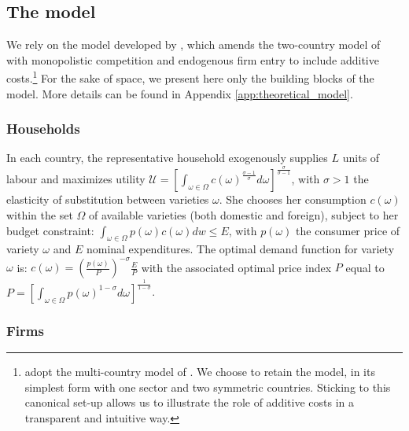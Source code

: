 \documentclass[a4paper,11pt]{article}
\begin{document}
\subsection{The model}


We rely on the model developed by \cite{sorensen2014}, which amends the two-country model of \cite{melitz} with monopolistic competition and endogenous firm entry to include additive costs.\footnote{\cite{Irrazabal_2015} adopt the multi-country model of \cite{chaney2008}.
We choose to retain the \cite{melitz} model, in its simplest form with one sector and two symmetric countries.
Sticking to this canonical set-up allows us to illustrate the role of additive costs in a transparent and intuitive way.}
For the sake of space, we  present here only the building blocks of the model. More details can be found in Appendix \ref{app:theoretical_model}.

\subsubsection{Households}

In each country, the representative household exogenously supplies $L$ units of labour and maximizes utility $\mathcal{U} = \left[ \int_{\omega \in \Omega}c(\omega)^{\frac{\sigma-1}{\sigma}} d\omega \right]^{\frac{\sigma}{\sigma-1}}$, with $\sigma>1$ the elasticity of substitution between varieties $\omega$. She chooses her consumption $c(\omega)$  within the set $\Omega$ of available varieties (both domestic and foreign), subject to her budget constraint: $\int_{\omega \in \Omega} p(\omega) c(\omega) dw \leq E$, with $p(\omega)$ the consumer price of variety $\omega$ and $E$ nominal expenditures. The optimal demand function for variety $\omega$ is: $c(\omega) = \left(\frac{p(\omega)}{P}  \right)^{-\sigma} \frac{E}{P}$ with the associated optimal price index $P$ equal to $P = \left[ \int_{\omega \in \Omega}p(\omega)^{1-\sigma}d\omega\right]^{\frac{1}{1-\sigma}} $.


\subsubsection{Firms}
\end{document}
